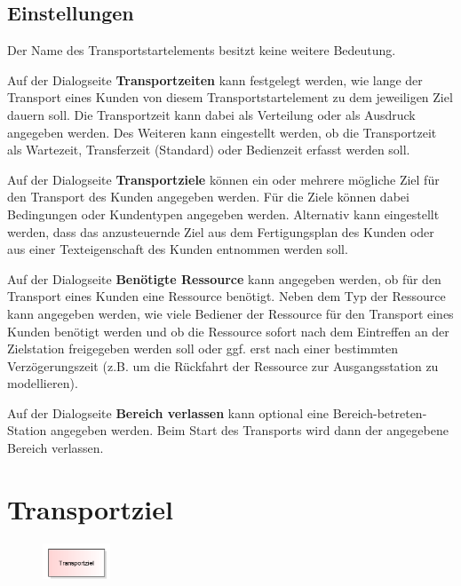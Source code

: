 \subsection*{Einstellungen}

Der Name des Transportstartelements besitzt keine weitere Bedeutung.

Auf der Dialogseite \textbf{Transportzeiten} kann festgelegt werden, wie lange der Transport
eines Kunden von diesem Transportstartelement zu dem jeweiligen Ziel dauern soll. Die Transportzeit
kann dabei als Verteilung oder als Ausdruck angegeben werden. Des Weiteren kann eingestellt
werden, ob die Transportzeit als Wartezeit, Transferzeit (Standard) oder Bedienzeit
erfasst werden soll.

Auf der Dialogseite \textbf{Transportziele} können ein oder mehrere
mögliche Ziel für den Transport des Kunden angegeben werden. Für die Ziele können dabei
Bedingungen oder Kundentypen angegeben werden. Alternativ kann eingestellt werden, dass
das anzusteuernde Ziel aus dem Fertigungsplan des Kunden oder aus einer Texteigenschaft
des Kunden entnommen werden soll.

Auf der Dialogseite \textbf{Benötigte Ressource} kann angegeben werden, ob
für den Transport eines Kunden eine Ressource benötigt. Neben dem Typ der
Ressource kann angegeben werden, wie viele Bediener der Ressource für den
Transport eines Kunden benötigt werden und ob die Ressource sofort nach dem
Eintreffen an der Zielstation freigegeben werden soll oder ggf. erst nach
einer bestimmten Verzögerungszeit (z.B. um die Rückfahrt der Ressource
zur Ausgangsstation zu modellieren).

Auf der Dialogseite \textbf{Bereich verlassen} kann optional eine
Bereich-betreten-Station angegeben werden. Beim Start des Transports
wird dann der angegebene Bereich verlassen.


\section{Transportziel}
\label{ref:ModelElementTransportDestination}

\begin{figure}
\vspace{-22pt}
\includegraphics[width=2cm]{imageModelElementTransportDestination.png}
\vspace{-22pt}
\end{figure}

